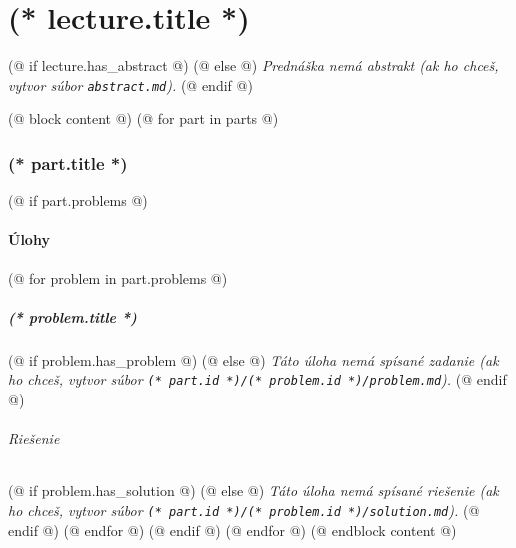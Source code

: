 \documentclass[12pt, twoside]{dgs}
\numberwithin{equation}{section}
\numberwithin{figure}{section}
\begin{document}
    \pagestyle{scholar}
    \part{(* lecture.title *)}%
    (@ if lecture.has_abstract @)
        \textit{}%
    (@ else @)
        \textit{Prednáška nemá abstrakt (ak ho chceš, vytvor súbor \texttt{abstract.md}).}
    (@ endif @)

    (@ block content @)
        (@ for part in parts @)
            \section{\texorpdfstring{(* part.title *)}{(* part.pdftitle|default(part.title) *)}}
                
                (@ if part.problems @)
                    \subsection{Úlohy}
                    (@ for problem in part.problems @)
                        \subsubsection{(* problem.title *)}
                            (@ if problem.has_problem @)
                            (@ else @)
                                \textit{Táto úloha nemá spísané zadanie
                                    (ak ho chceš, vytvor súbor \texttt{(* part.id *)/(* problem.id *)/problem.md}).}
                            (@ endif @)
                            \paragraph{Riešenie}
                            (@ if problem.has_solution @)
                            (@ else @)
                                \textit{Táto úloha nemá spísané riešenie
                                    (ak ho chceš, vytvor súbor \texttt{(* part.id *)/(* problem.id *)/solution.md}).}
                            (@ endif @)
                    (@ endfor @)
                (@ endif @)
        (@ endfor @)
    (@ endblock content @)
\end{document}
